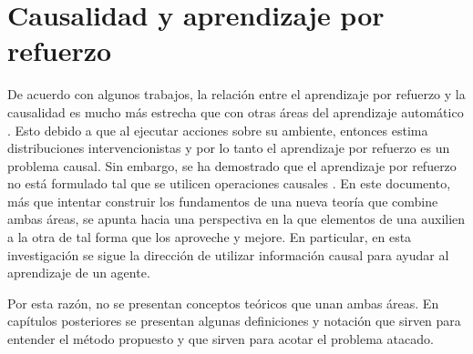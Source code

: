




\section{Causalidad y aprendizaje por refuerzo}

De acuerdo con algunos trabajos, la relación entre el aprendizaje por refuerzo
y la causalidad es mucho más estrecha que con otras áreas del
aprendizaje automático \cite{schlkopf2019causality} \cite{Gershman2017}. Esto debido a que al ejecutar acciones sobre su ambiente, entonces
estima distribuciones intervencionistas y por lo tanto el aprendizaje por refuerzo es un problema causal. Sin embargo, se ha demostrado que el aprendizaje
por refuerzo no está formulado tal que se utilicen operaciones
causales \cite{gonzalezsoto2019reinforcement}.
En este documento, más que intentar construir los fundamentos de una nueva 
teoría que combine ambas áreas, se apunta hacia una perspectiva
en la que elementos de una auxilien a la otra de tal forma que
los aproveche y mejore. En particular, en esta investigación
se sigue la dirección de utilizar información causal para ayudar al 
aprendizaje de un agente.

Por esta razón, no se presentan conceptos teóricos que unan ambas áreas. 
En capítulos posteriores se presentan algunas definiciones y notación
que sirven para entender el método propuesto y que sirven para acotar el
problema atacado.
